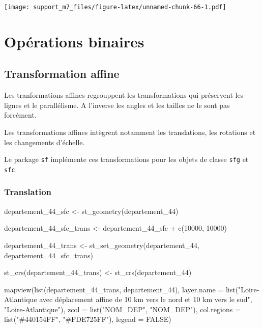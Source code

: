 \documentclass[
]{book}
\newenvironment{Shaded}{\begin{snugshade}}{\end{snugshade}}
\newcommand{\AttributeTok}[1]{\textcolor[rgb]{0.77,0.63,0.00}{#1}}
\newcommand{\ConstantTok}[1]{\textcolor[rgb]{0.00,0.00,0.00}{#1}}
\newcommand{\DecValTok}[1]{\textcolor[rgb]{0.00,0.00,0.81}{#1}}
\newcommand{\FunctionTok}[1]{\textcolor[rgb]{0.00,0.00,0.00}{#1}}
\newcommand{\NormalTok}[1]{#1}
\newcommand{\OtherTok}[1]{\textcolor[rgb]{0.56,0.35,0.01}{#1}}
\newcommand{\SpecialCharTok}[1]{\textcolor[rgb]{0.00,0.00,0.00}{#1}}
\newcommand{\StringTok}[1]{\textcolor[rgb]{0.31,0.60,0.02}{#1}}
\begin{document}
\texttt{[image: support\_m7\_files/figure-latex/unnamed-chunk-66-1.pdf]}

\hypertarget{opuxe9rations-binaires}{%
\section{Opérations binaires}\label{opuxe9rations-binaires}}

\hypertarget{transformation-affine}{%
\subsection{Transformation affine}\label{transformation-affine}}

Les tranformations affines regrouppent les transformations qui préservent les lignes et le parallélisme. A l'inverse les angles et les tailles ne le sont pas forcément.

Les transformations affines intègrent notamment les translations, les rotations et les changements d'échelle.

Le package \texttt{sf} implémente ces transformations pour les objets de classe \texttt{sfg} et \texttt{sfc}.

\hypertarget{translation}{%
\subsubsection{Translation}\label{translation}}

\begin{Shaded}
\begin{Highlighting}[]
\NormalTok{departement\_44\_sfc }\OtherTok{\textless{}{-}} \FunctionTok{st\_geometry}\NormalTok{(departement\_44)}

\NormalTok{departement\_44\_sfc\_trans }\OtherTok{\textless{}{-}}\NormalTok{ departement\_44\_sfc }\SpecialCharTok{+} \FunctionTok{c}\NormalTok{(}\DecValTok{10000}\NormalTok{, }\DecValTok{10000}\NormalTok{)}

\NormalTok{departement\_44\_trans }\OtherTok{\textless{}{-}} \FunctionTok{st\_set\_geometry}\NormalTok{(departement\_44, departement\_44\_sfc\_trans)}

\FunctionTok{st\_crs}\NormalTok{(departement\_44\_trans) }\OtherTok{\textless{}{-}} \FunctionTok{st\_crs}\NormalTok{(departement\_44)}

\FunctionTok{mapview}\NormalTok{(}\FunctionTok{list}\NormalTok{(departement\_44\_trans, departement\_44), }\AttributeTok{layer.name =} \FunctionTok{list}\NormalTok{(}\StringTok{"Loire{-}Atlantique avec déplacement affine de 10 km vers le nord et 10 km vers le sud"}\NormalTok{, }\StringTok{"Loire{-}Atlantique"}\NormalTok{), }\AttributeTok{zcol =} \FunctionTok{list}\NormalTok{(}\StringTok{"NOM\_DEP"}\NormalTok{, }\StringTok{"NOM\_DEP"}\NormalTok{), }\AttributeTok{col.regions =} \FunctionTok{list}\NormalTok{(}\StringTok{"\#440154FF"}\NormalTok{, }\StringTok{"\#FDE725FF"}\NormalTok{), }\AttributeTok{legend =} \ConstantTok{FALSE}\NormalTok{)}
\end{Highlighting}
\end{Shaded}
\end{document}
